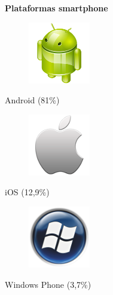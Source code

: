 \begin{slide}
  \begin{block}{\textbf{Plataformas smartphone}}
    \begin{center}
      \begin{minipage}[b]{0.4\linewidth}
        \begin{center}
          \begin{figure}[!h]
            \includegraphics[height=0.25\textheight]{img/android.png}
          \end{figure}
          Android (81\%)
        \end{center}
      \end{minipage}
      \vspace{0.5cm}
      \begin{minipage}[b]{0.4\linewidth}
        \begin{center}
          \begin{figure}[!h]
            \includegraphics[height=0.25\textheight]{img/ios.png}
          \end{figure}
          iOS (12,9\%)
        \end{center}
      \end{minipage}
      \begin{minipage}[b]{0.4\linewidth}
        \begin{center}
          \begin{figure}[!h]
            \includegraphics[height=0.25\textheight]{img/wphone.png}
          \end{figure}
          Windows Phone (3,7\%)
        \end{center}

\end{minipage}
\end{center}
\end{block}
\end{slide}
